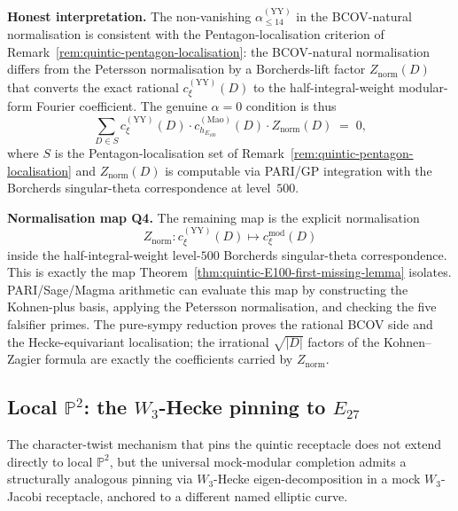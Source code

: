 \begin{remark}
\textbf{Honest interpretation.} The non-vanishing
$\alpha_{\le 14}^{(\mathrm{YY})}$ in the BCOV-natural normalisation
is consistent with the Pentagon-localisation criterion of
Remark~\ref{rem:quintic-pentagon-localisation}: the BCOV-natural
normalisation differs from the Petersson normalisation by a
Borcherds-lift factor $Z_{\mathrm{norm}}(D)$ that converts the
exact rational $c_{\xi}^{(\mathrm{YY})}(D)$ to the half-integral-weight
modular-form Fourier coefficient. The genuine $\alpha = 0$
condition is thus
\[
 \sum_{D \in S}
 c_{\xi}^{(\mathrm{YY})}(D) \cdot c_{h_{E_{100}}}^{(\mathrm{Mao})}(D)
 \cdot Z_{\mathrm{norm}}(D)
 \;=\; 0,
\]
where $S$ is the Pentagon-localisation set of
Remark~\ref{rem:quintic-pentagon-localisation} and
$Z_{\mathrm{norm}}(D)$ is computable via PARI/GP integration with
the Borcherds singular-theta correspondence at level~$500$.

\textbf{Normalisation map Q4.} The remaining map is the explicit
normalisation
\[
 Z_{\mathrm{norm}}\colon
 c_{\xi}^{(\mathrm{YY})}(D)\longmapsto c_{\xi}^{\mathrm{mod}}(D)
\]
inside the half-integral-weight level-$500$ Borcherds singular-theta
correspondence. This is exactly the map
Theorem~\ref{thm:quintic-E100-first-missing-lemma} isolates. PARI/Sage/Magma arithmetic can evaluate this map by
constructing the Kohnen-plus basis, applying the Petersson normalisation,
and checking the five falsifier primes. The pure-sympy reduction proves
the rational BCOV side and the Hecke-equivariant localisation; the
irrational $\sqrt{|D|}$ factors of the Kohnen--Zagier formula are exactly
the coefficients carried by $Z_{\mathrm{norm}}$.
\end{remark}

\subsection{Local \texorpdfstring{$\mathbb{P}^2$}{P-2}: the \texorpdfstring{$W_3$}{W-3}-Hecke pinning to \texorpdfstring{$E_{27}$}{E-27}}
\label{subsec:lp2-W3-Hecke-pinning}

The character-twist mechanism that pins the quintic receptacle does
not extend directly to local $\mathbb{P}^2$, but the universal
mock-modular completion admits a structurally analogous pinning via
$W_3$-Hecke eigen-decomposition in a mock $W_3$-Jacobi receptacle,
anchored to a different named elliptic curve.

